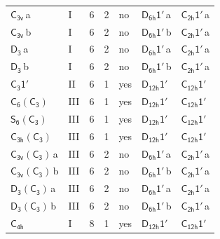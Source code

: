\documentclass[10pt,a4paper]{article}
\numberwithin{equation}{section}
\newcommand{\grp}[1]{\mathsf{#1}}
\newcommand{\clsletter}[1]{\,{\scriptsize\color{black!55}#1}}
\begin{document}
{\begin{longtable}{@{}llrrlll@{}}
\href{../../../rotation/data/pdf/C3v.pdf}{$\grp{C_{3v}}$}\clsletter{a} & I & 6 & 2 & no & \href{D6h-1p.pdf}{$\grp{D_{6h}1'}$}\clsletter{a} & \href{C2h-1p.pdf}{$\grp{C_{2h}1'}$}\clsletter{a}\\
\href{../../../rotation/data/pdf/C3v.pdf}{$\grp{C_{3v}}$}\clsletter{b} & I & 6 & 2 & no & \href{D6h-1p.pdf}{$\grp{D_{6h}1'}$}\clsletter{b} & \href{C2h-1p.pdf}{$\grp{C_{2h}1'}$}\clsletter{a}\\
\href{../../../rotation/data/pdf/D3.pdf}{$\grp{D_{3}}$}\clsletter{a} & I & 6 & 2 & no & \href{D6h-1p.pdf}{$\grp{D_{6h}1'}$}\clsletter{a} & \href{C2h-1p.pdf}{$\grp{C_{2h}1'}$}\clsletter{a}\\
\href{../../../rotation/data/pdf/D3.pdf}{$\grp{D_{3}}$}\clsletter{b} & I & 6 & 2 & no & \href{D6h-1p.pdf}{$\grp{D_{6h}1'}$}\clsletter{b} & \href{C2h-1p.pdf}{$\grp{C_{2h}1'}$}\clsletter{a}\\
\href{C3-1p.pdf}{$\grp{C_{3}1'}$} & II & 6 & 1 & yes & \href{D12h-1p.pdf}{$\grp{D_{12h}1'}$} & \href{C12h-1p.pdf}{$\grp{C_{12h}1'}$}\\
\href{C6-C3.pdf}{$\grp{C_{6}}(\grp{C_{3}})$} & III & 6 & 1 & yes & \href{D12h-1p.pdf}{$\grp{D_{12h}1'}$} & \href{C12h-1p.pdf}{$\grp{C_{12h}1'}$}\\
\href{S6-C3.pdf}{$\grp{S_{6}}(\grp{C_{3}})$} & III & 6 & 1 & yes & \href{D12h-1p.pdf}{$\grp{D_{12h}1'}$} & \href{C12h-1p.pdf}{$\grp{C_{12h}1'}$}\\
\href{C3h-C3.pdf}{$\grp{C_{3h}}(\grp{C_{3}})$} & III & 6 & 1 & yes & \href{D12h-1p.pdf}{$\grp{D_{12h}1'}$} & \href{C12h-1p.pdf}{$\grp{C_{12h}1'}$}\\
\href{C3v-C3.pdf}{$\grp{C_{3v}}(\grp{C_{3}})$}\clsletter{a} & III & 6 & 2 & no & \href{D6h-1p.pdf}{$\grp{D_{6h}1'}$}\clsletter{a} & \href{C2h-1p.pdf}{$\grp{C_{2h}1'}$}\clsletter{a}\\
\href{C3v-C3.pdf}{$\grp{C_{3v}}(\grp{C_{3}})$}\clsletter{b} & III & 6 & 2 & no & \href{D6h-1p.pdf}{$\grp{D_{6h}1'}$}\clsletter{b} & \href{C2h-1p.pdf}{$\grp{C_{2h}1'}$}\clsletter{a}\\
\href{D3-C3.pdf}{$\grp{D_{3}}(\grp{C_{3}})$}\clsletter{a} & III & 6 & 2 & no & \href{D6h-1p.pdf}{$\grp{D_{6h}1'}$}\clsletter{a} & \href{C2h-1p.pdf}{$\grp{C_{2h}1'}$}\clsletter{a}\\
\href{D3-C3.pdf}{$\grp{D_{3}}(\grp{C_{3}})$}\clsletter{b} & III & 6 & 2 & no & \href{D6h-1p.pdf}{$\grp{D_{6h}1'}$}\clsletter{b} & \href{C2h-1p.pdf}{$\grp{C_{2h}1'}$}\clsletter{a}\\
\href{../../../rotation/data/pdf/C4h.pdf}{$\grp{C_{4h}}$} & I & 8 & 1 & yes & \href{D12h-1p.pdf}{$\grp{D_{12h}1'}$} & \href{C12h-1p.pdf}{$\grp{C_{12h}1'}$}\\

\end{longtable}}
\end{document}
